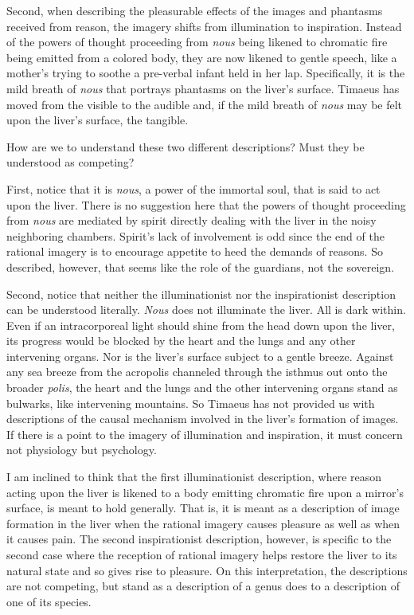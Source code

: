 Second, when describing the pleasurable effects of the images and phantasms received from reason, the imagery shifts from illumination to inspiration. Instead of the powers of thought proceeding from \emph{nous} being likened to chromatic fire being emitted from a colored body, they are now likened to gentle speech, like a mother's trying to soothe a pre-verbal infant held in her lap. Specifically, it is the mild breath of \emph{nous} that portrays phantasms on the liver's surface. Timaeus has moved from the visible to the audible and, if the mild breath of \emph{nous} may be felt upon the liver's surface, the tangible. 

How are we to understand these two different descriptions? Must they be understood as competing?

First, notice that it is \emph{nous}, a power of the immortal soul, that is said to act upon the liver. There is no suggestion here that the powers of thought proceeding from \emph{nous} are mediated by spirit directly dealing with the liver in the noisy neighboring chambers. Spirit's lack of involvement is odd since the end of the rational imagery is to encourage appetite to heed the demands of reasons. So described, however, that seems like the role of the guardians, not the sovereign. 

Second, notice that neither the illuminationist nor the inspirationist description can be understood literally. \emph{Nous} does not illuminate the liver. All is dark within. Even if an intracorporeal light should shine from the head down upon the liver, its progress would be blocked by the heart and the lungs and any other intervening organs. Nor is the liver's surface subject to a gentle breeze. Against any sea breeze from the acropolis channeled through the isthmus out onto the broader \emph{polis}, the heart and the lungs and the other intervening organs stand as bulwarks, like intervening mountains. So Timaeus has not provided us with descriptions of the causal mechanism involved in the liver's formation of images. If there is a point to the imagery of illumination and inspiration, it must concern not physiology but psychology. 

I am inclined to think that the first illuminationist description, where reason acting upon the liver is likened to a body emitting chromatic fire upon a mirror's surface, is meant to hold generally. That is, it is meant as a description of image formation in the liver when the rational imagery causes pleasure as well as when it causes pain. The second inspirationist description, however, is specific to the second case where the reception of rational imagery helps restore the liver to its natural state and so gives rise to pleasure. On this interpretation, the descriptions are not competing, but stand as a description of a genus does to a description of one of its species.

